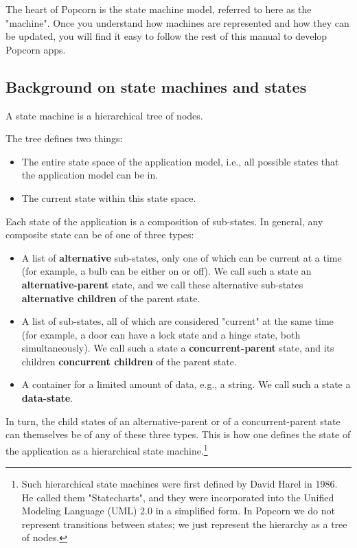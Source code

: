 \documentclass[12pt]{article}
\begin{document}
The heart of Popcorn is the state machine model, referred to here as
the "machine". Once you understand how machines are represented and
how they can be updated, you will find it easy to follow the rest of
this manual to develop Popcorn apps.

\subsection{Background on state machines and states}

A state machine is a hierarchical tree of nodes.

The tree defines two things:

\begin{itemize}
\item The entire state space of the application model, i.e., all possible
states that the application model can be in.

\item The current state within this state space.
\end{itemize}

Each state of the application is a composition of sub-states. In
general, any composite state can be of one of three types:

\begin{itemize}

\item A list of {\bf alternative} sub-states, only one of which can be
  current at a time (for example, a bulb can be either on or off). We
  call such a state an {\bf alternative-parent} state, and we call
  these alternative sub-states {\bf alternative children} of the
  parent state.

\item A list of sub-states, all of which are considered "current" at
  the same time (for example, a door can have a lock state and a hinge
  state, both simultaneously). We call such a state a {\bf
    concurrent-parent} state, and its children {\bf concurrent
    children} of the parent state.

\item A container for a limited amount of data, e.g., a string.  We call
  such a state a {\bf data-state}.

\end{itemize}

In turn, the child states of an alternative-parent or of a
concurrent-parent state can themselves be of any of these three types.
This is how one defines the state of the application as a hierarchical
state machine.\footnote{
  Such hierarchical state machines were first defined by David Harel
  in 1986. He called them "Statecharts", and they were incorporated
  into the Unified Modeling Language (UML) 2.0 in a simplified
  form. In Popcorn we do not represent transitions between states; we
  just represent the hierarchy as a tree of nodes.}
\end{document}
